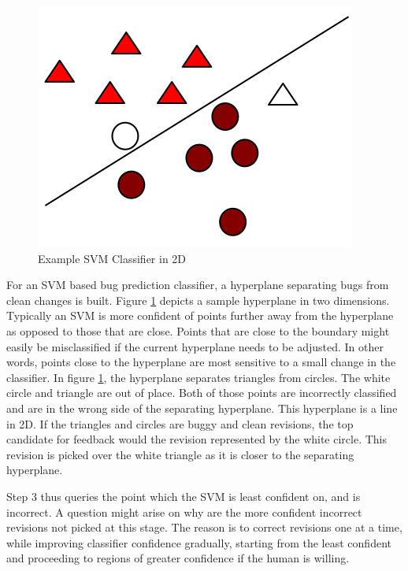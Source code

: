 \documentclass[10pt, conference, letterpaper, compsocconf]{IEEEtran}
\begin{document}
\begin{figure}[t]
\begin{center}
 \includegraphics[scale=0.40]{pictures/svm.png}
\end{center}
\caption{Example SVM Classifier in 2D}
\label{example_svm}

\end{figure}

For an SVM based bug prediction classifier, a hyperplane separating bugs from clean changes is built.
Figure \ref{example_svm} depicts a sample hyperplane in two dimensions.
Typically an SVM is more confident of points further away from the hyperplane as opposed to those that are close.
Points that are close to the boundary might easily be misclassified if the current hyperplane needs to be adjusted.
In other words, points close to the hyperplane are most sensitive to a small change in the classifier. In figure \ref{example_svm}, the hyperplane separates triangles from circles. The white circle and triangle are out of place.
 Both of those points are incorrectly classified and are in the wrong side of the separating hyperplane.
 This hyperplane is a line in 2D. If the triangles and circles are buggy and clean revisions, the top candidate for feedback would the revision represented by the white circle.
This revision is picked over the white triangle as it is closer to the separating hyperplane.

Step 3 thus queries the point which the SVM is least confident on, and is incorrect. A question might arise on why are the more confident incorrect revisions not picked at this stage. The reason is to correct revisions one at a time,
while improving classifier confidence gradually, starting from the least confident and proceeding to regions of greater confidence if the human is willing.
\end{document}
